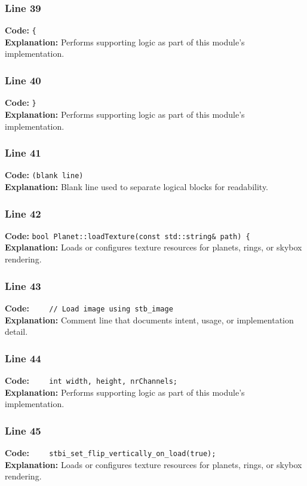\documentclass[11pt,a4paper]{article}
\begin{document}
\subsubsection*{Line 39}
\textbf{Code:} \verb|{|\\
\textbf{Explanation:} Performs supporting logic as part of this module's implementation.

\subsubsection*{Line 40}
\textbf{Code:} \verb|}|\\
\textbf{Explanation:} Performs supporting logic as part of this module's implementation.

\subsubsection*{Line 41}
\textbf{Code:} \texttt{(blank line)}\\
\textbf{Explanation:} Blank line used to separate logical blocks for readability.

\subsubsection*{Line 42}
\textbf{Code:} \verb|bool Planet::loadTexture(const std::string& path) {|\\
\textbf{Explanation:} Loads or configures texture resources for planets, rings, or skybox rendering.

\subsubsection*{Line 43}
\textbf{Code:} \verb|    // Load image using stb_image|\\
\textbf{Explanation:} Comment line that documents intent, usage, or implementation detail.

\subsubsection*{Line 44}
\textbf{Code:} \verb|    int width, height, nrChannels;|\\
\textbf{Explanation:} Performs supporting logic as part of this module's implementation.

\subsubsection*{Line 45}
\textbf{Code:} \verb|    stbi_set_flip_vertically_on_load(true);|\\
\textbf{Explanation:} Loads or configures texture resources for planets, rings, or skybox rendering.
\end{document}
